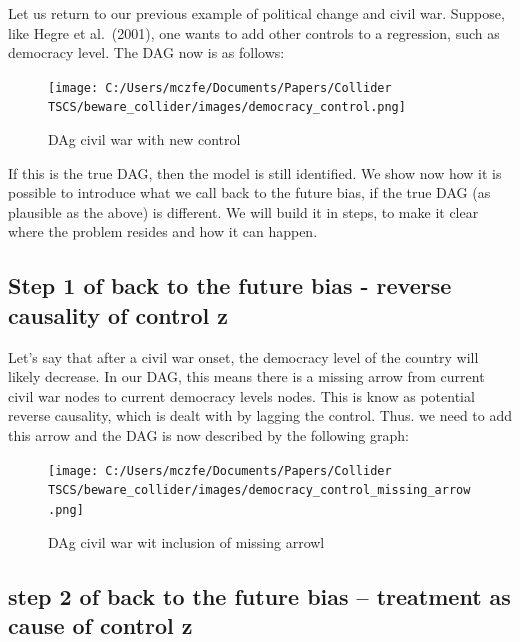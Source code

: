 \documentclass[
  super,
  preprint,
  3p]{elsarticle}
\begin{document}
Let us return to our previous example of political change and civil war.
Suppose, like Hegre et al.~(2001), one wants to add other controls to a
regression, such as democracy level. The DAG now is as follows:

\begin{figure}

{\centering \texttt{[image: C:/Users/mczfe/Documents/Papers/Collider TSCS/beware\_collider/images/democracy\_control.png]}

}

\caption{DAg civil war with new control}

\end{figure}

If this is the true DAG, then the model is still identified. We show now
how it is possible to introduce what we call back to the future bias, if
the true DAG (as plausible as the above) is different. We will build it
in steps, to make it clear where the problem resides and how it can
happen.

\hypertarget{step-1-of-back-to-the-future-bias---reverse-causality-of-control-z}{%
\subsection{Step 1 of back to the future bias - reverse causality of
control
z}\label{step-1-of-back-to-the-future-bias---reverse-causality-of-control-z}}

Let's say that after a civil war onset, the democracy level of the
country will likely decrease. In our DAG, this means there is a missing
arrow from current civil war nodes to current democracy levels nodes.
This is know as potential reverse causality, which is dealt with by
lagging the control. Thus. we need to add this arrow and the DAG is now
described by the following graph:

\begin{figure}

{\centering \texttt{[image: C:/Users/mczfe/Documents/Papers/Collider TSCS/beware\_collider/images/democracy\_control\_missing\_arrow.png]}

}

\caption{DAg civil war wit inclusion of missing arrowl}

\end{figure}

\hypertarget{step-2-of-back-to-the-future-bias-treatment-as-cause-of-control-z}{%
\subsection{step 2 of back to the future bias -- treatment as cause of
control
z}\label{step-2-of-back-to-the-future-bias-treatment-as-cause-of-control-z}}
\end{document}
